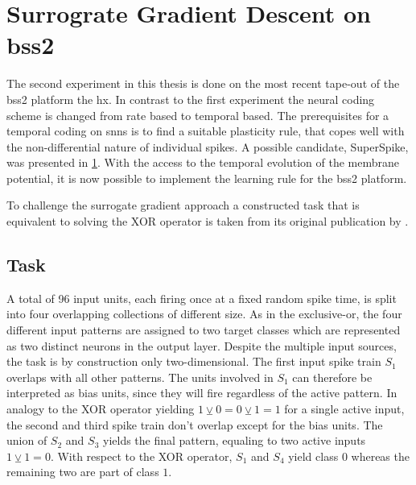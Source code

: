 \chapter{Surrograte Gradient Descent on \acrshort{bss2}}
\label{superspike}
The second experiment in this thesis is done on the most recent tape-out of the \gls{bss2} platform the \gls{hx}. In contrast to the first experiment the neural coding scheme is changed from rate based to temporal based. The prerequisites for a temporal coding on \glspl{snn} is to find a suitable plasticity rule, that copes well with the non-differential nature of individual spikes. A possible candidate, SuperSpike, was presented in \cref{superspike}. With the access to the temporal evolution of the membrane potential, it is now possible to implement the learning rule for the \gls{bss2} platform.

To challenge the surrogate gradient approach a constructed task that is equivalent to solving the XOR operator is taken from its original publication by \cite{zenke2018superspike}.

\section{Task}
A total of 96 input units, each firing once at a fixed random spike time, is split into four overlapping collections of different size. As in the exclusive-or, the four different input patterns are assigned to two target classes which are represented as two distinct neurons in the output layer. Despite the multiple input sources, the task is by construction only two-dimensional. The first input spike train $S_1$ overlaps with all other patterns. The units involved in $S_1$ can therefore be interpreted as bias units, since they will fire regardless of the active pattern. In analogy to the XOR operator yielding $1 \veebar 0 = 0 \veebar 1 = 1$ for a single active input, the second and third spike train don't overlap except for the bias units. The union of $S_2$ and $S_3$ yields the final pattern, equaling to two active inputs $1 \veebar 1 = 0$. With respect to the XOR operator, $S_1$ and $S_4$ yield class $0$ whereas the remaining two are part of class $1$. 

